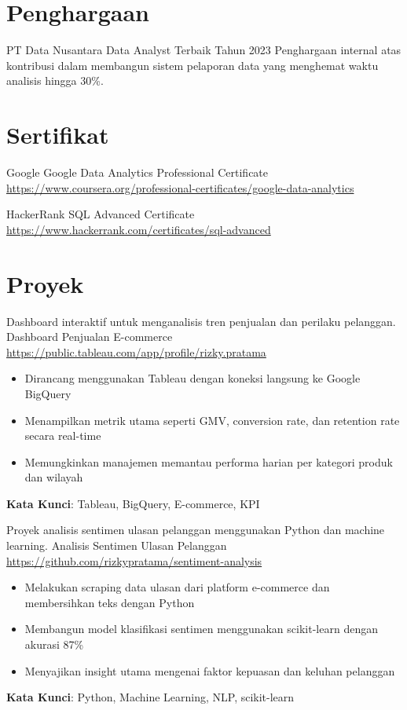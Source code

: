 \documentclass[a4paper, serif, 10pt]{moderncv}
\begin{document}
\section{Penghargaan}

        {PT Data Nusantara}
        {Data Analyst Terbaik Tahun 2023}
        {}
        {}
        {Penghargaan internal atas kontribusi dalam membangun sistem pelaporan data yang menghemat waktu analisis hingga 30\%.}
\section{Sertifikat}

        {Google}
        {Google Data Analytics Professional Certificate}
        {\url{https://www.coursera.org/professional-certificates/google-data-analytics}}
        {}
        {}

        {HackerRank}
        {SQL Advanced Certificate}
        {\url{https://www.hackerrank.com/certificates/sql-advanced}}
        {}
        {}
\section{Proyek}

        {Dashboard interaktif untuk menganalisis tren penjualan dan perilaku pelanggan.}
        {Dashboard Penjualan E-commerce}
        {\url{https://public.tableau.com/app/profile/rizky.pratama}}
        {}
        {\begin{itemize}
\item Dirancang menggunakan Tableau dengan koneksi langsung ke Google BigQuery
\item Menampilkan metrik utama seperti GMV, conversion rate, dan retention rate secara real-time
\item Memungkinkan manajemen memantau performa harian per kategori produk dan wilayah
\end{itemize}
\textbf{Kata Kunci}: Tableau, BigQuery, E-commerce, KPI}

        {Proyek analisis sentimen ulasan pelanggan menggunakan Python dan machine learning.}
        {Analisis Sentimen Ulasan Pelanggan}
        {\url{https://github.com/rizkypratama/sentiment-analysis}}
        {}
        {\begin{itemize}
\item Melakukan scraping data ulasan dari platform e-commerce dan membersihkan teks dengan Python
\item Membangun model klasifikasi sentimen menggunakan scikit-learn dengan akurasi 87\%
\item Menyajikan insight utama mengenai faktor kepuasan dan keluhan pelanggan
\end{itemize}
\textbf{Kata Kunci}: Python, Machine Learning, NLP, scikit-learn}
\end{document}
